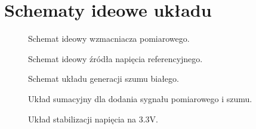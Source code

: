 \section{Schematy ideowe układu}
    \begin{figure}[!ht]
        \centering
        \scalebox{1}{}
        \caption{Schemat ideowy wzmacniacza pomiarowego.}
        \label{sch:INA333}
    \end{figure}
    \begin{figure}[!ht]
        \centering
        \scalebox{1}{}
        \caption{Schemat ideowy źródła napięcia referencyjnego.}
        \label{sch:Vref_gen}
    \end{figure}
    \begin{figure}[!ht]
        \centering
        \scalebox{1}{}
        \caption{Schemat układu generacji szumu białego.}
        \label{sch:Noise_gen}
    \end{figure}
    \begin{figure}[!ht]
        \centering
        \scalebox{1}{}
        \caption{Układ sumacyjny dla dodania sygnału pomiarowego i szumu.}
        \label{sch:sumator}
    \end{figure}
    \begin{figure}[!ht]
        \centering
        \scalebox{1}{}
        \caption{Układ stabilizacji napięcia na 3.3V. }
        \label{sch:psu}
    \end{figure}